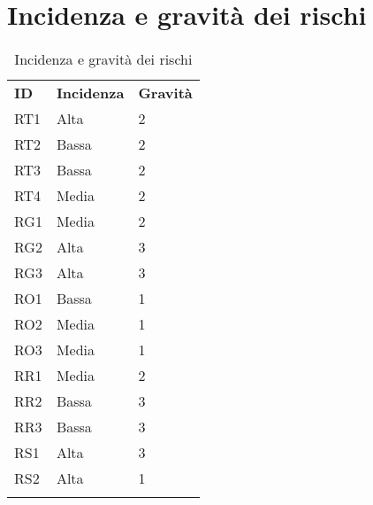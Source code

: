\section{Incidenza e gravità dei rischi}
	\begin{longtable} {
		>{}p{24mm} 
		>{}p{32mm}
		>{}p{32mm} 
		}
	\rowcolor{gray!50}
		\textbf{ID} & \textbf{Incidenza} & \textbf{Gravità}	\TBstrut \\
		RT1 & Alta & 2 \TBstrut \\ [2mm]
		RT2 & Bassa & 2 \TBstrut \\ [2mm]
		RT3 & Bassa & 2 \TBstrut \\ [2mm]
		RT4 & Media & 2 \TBstrut \\ [2mm]
		RG1 & Media & 2 \TBstrut \\ [2mm]
		RG2 & Alta & 3 \TBstrut \\ [2mm]
		RG3 & Alta & 3 \TBstrut \\ [2mm]
		RO1 & Bassa & 1 \TBstrut \\ [2mm]
		RO2 & Media & 1 \TBstrut \\ [2mm]
		RO3 & Media & 1 \TBstrut \\ [2mm]
		RR1 & Media & 2 \TBstrut \\ [2mm]
		RR2 & Bassa & 3 \TBstrut \\ [2mm]
		RR3 & Bassa & 3 \TBstrut \\ [2mm]
		RS1 & Alta & 3 \TBstrut \\ [2mm]
		RS2 & Alta & 1 \TBstrut \\ [2mm]
		\rowcolor{white}
		\caption{Incidenza e gravità dei rischi}
	\end{longtable}
